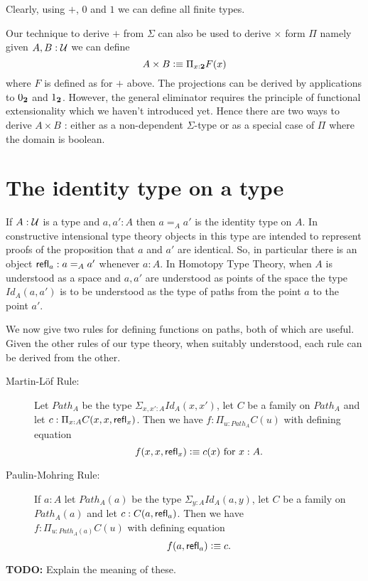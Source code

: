 {Clearly, using $+$, $0$ and $1$ we can define all finite types.

Our technique to derive $+$ from $\Sigma$ can also be used to derive
$\times$ form $\Pi$ namely given $A,B:\mathcal{U}$ we can define 
\[ A \times B \vcentcolon\equiv \Pi_{x:\mathbf{2}}F(x)\]
where $F$ is defined as for $+$ above. The projections can be derived
by applications to $0_\mathbf{2}$ and $1_\mathbf{2}$. However, the general
eliminator requires the principle of functional extensionality which
we haven't introduced yet. Hence there are two ways to derive $A\times
B$ : either as a non-dependent $\Sigma$-type or as a special case of
$\Pi$ where the domain is boolean. 

\section{The identity type on a type}
\label{sec:identity-types}

If $A:\mathcal{U}$ is a type and $a,a':A$ then $a =_A a'$ is the identity type on $A$.  
In constructive intensional type theory objects in this type are
intended to represent proofs of the proposition that $a$ and $a'$ are
identical.  So, in particular there is an object $\mathsf{refl}_{a}: a =_A a'$ whenever $a:A$.  In Homotopy Type Theory, when $A$ is understood as a space and $a,a'$ are understood as points of the space the type $Id_A(a,a')$ is to be understood as the type of paths from the point $a$ to the point $a'$.

We now give two rules for defining functions on paths, both of which are useful.  Given the other rules of our type theory, when suitably understood, each rule can be derived from the other. 

\begin{description}
\item[Martin-L\"{o}f Rule:] Let $Path_A$ be the type $\Sigma_{x,x':A}Id_A(x,x')$, let $C$ be a family on $Path_A$ and let $c:\Pi_{x:A}C(x,x,\mathsf{refl}_{x})$.  Then we have $f:\Pi_{u:Path_A}C(u)$ with defining equation
  \[ f(x,x,\mathsf{refl}_{x})\vcentcolon\equiv c(x)\mbox{ for } x:A.\]
\item[Paulin-Mohring Rule:] If $a:A$ let $Path_A(a)$ be the type $\Sigma_{y:A}Id_A(a,y)$, let $C$ be a family on $Path_A(a)$ and let $c:C(a,\mathsf{refl}_{a})$. Then we have\\ $f:\Pi_{u:Path_A(a)}C(u)$ with defining equation
    \[ f(a,\mathsf{refl}_{a})\vcentcolon\equiv c.\]
\end{description}

\textbf{TODO:} Explain the meaning of these.

}
